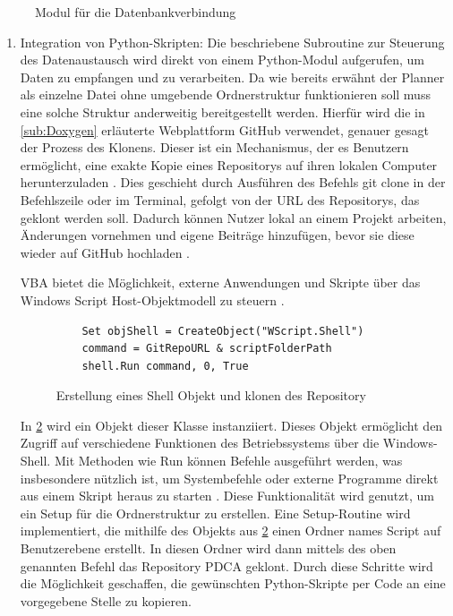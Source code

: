 \documentclass[11pt,a4paper]{report}
\begin{document}
\begin{figure}[H]
    \centerline{}
    \caption{Modul für die Datenbankverbindung}
    \label{fig:Database_modul}
\end{figure}

\begin{enumerate}\addtocounter{enumi}{2}
     \item Integration von Python-Skripten: Die beschriebene Subroutine zur Steuerung des Datenaustausch wird direkt von einem Python-Modul aufgerufen, um Daten zu empfangen und zu verarbeiten. Da wie bereits erwähnt der Planner als einzelne Datei ohne umgebende Ordnerstruktur funktionieren soll muss eine solche Struktur anderweitig bereitgestellt werden. Hierfür wird die in \ref{sub:Doxygen} erläuterte Webplattform GitHub verwendet, genauer gesagt der Prozess des Klonens. Dieser ist ein Mechanismus, der es Benutzern ermöglicht, eine exakte Kopie eines Repositorys auf ihren lokalen Computer herunterzuladen \cite{git_clone}. Dies geschieht durch Ausführen des Befehls \glqq git clone \grqq{} in der Befehlszeile oder im Terminal, gefolgt von der URL des Repositorys, das geklont werden soll.
    Dadurch können Nutzer lokal an einem Projekt arbeiten, Änderungen vornehmen und eigene Beiträge hinzufügen, bevor sie diese wieder auf GitHub hochladen \cite{git_clone}.

    \noindent
    VBA bietet die Möglichkeit, externe Anwendungen und Skripte über das Windows Script Host-Objektmodell zu steuern \cite{shell_objekt}. 
    \begin{figure}[H]
        \centering
        \begin{verbatim}
    Set objShell = CreateObject("WScript.Shell")
    command = GitRepoURL & scriptFolderPath
    shell.Run command, 0, True
        \end{verbatim}
    \caption{Erstellung eines Shell Objekt und klonen des Repository}
    \label{code:WScript.shell}
    \end{figure}

    \noindent
    In \ref{code:WScript.shell} wird ein Objekt dieser Klasse instanziiert. Dieses Objekt ermöglicht den Zugriff auf verschiedene Funktionen des Betriebssystems über die Windows-Shell. Mit Methoden wie \glqq Run \grqq{} können Befehle ausgeführt werden, was insbesondere nützlich ist, um Systembefehle oder externe Programme direkt aus einem Skript heraus zu starten \cite{shell_objekt}. Diese Funktionalität wird genutzt, um ein Setup für die Ordnerstruktur zu erstellen. Eine Setup-Routine wird implementiert, die mithilfe des Objekts aus \ref{code:WScript.shell} einen Ordner names \glqq Script \grqq{} auf Benutzerebene erstellt. In diesen Ordner wird dann mittels des oben genannten Befehl das  Repository \glqq PDCA\grqq{} geklont. Durch diese Schritte wird die Möglichkeit geschaffen, die gewünschten Python-Skripte per Code an eine vorgegebene Stelle zu kopieren.


\end{enumerate}
\end{document}
